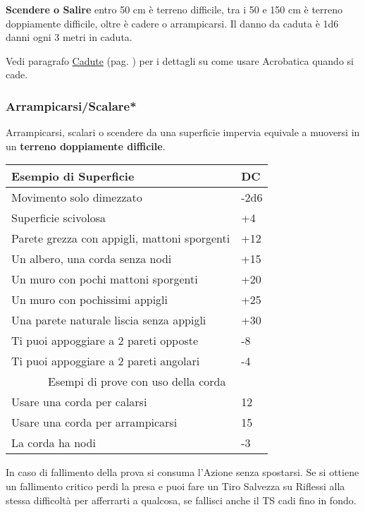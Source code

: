 \begin{multicols}{2}
\textbf{Scendere o Salire} entro 50 cm è terreno difficile, tra i 50 e 150 cm è terreno doppiamente difficile, oltre è cadere o arrampicarsi. Il danno da caduta è 1d6 danni ogni 3 metri in caduta. 

Vedi paragrafo \hyperlink{cadute}{Cadute} (pag. \pageref{cadute}) per i dettagli su come usare Acrobatica quando si cade.

\titlespacing*{\subsubsection}{0pt}{0.5em}{0.5em}\subsubsection*{Arrampicarsi/Scalare*} \label{arrampicarsi}

Arrampicarsi, scalari o scendere da una superficie impervia equivale a muoversi in un \textbf{terreno doppiamente difficile}.

\medskip

\noindent\begin{tabularx}{0.47\textwidth}{Xl}
	\textbf{Esempio di Superficie} & \textbf{DC}\\
	\toprule
	Movimento solo dimezzato & -2d6\\
	Superficie scivolosa&+4\\
	{\small Parete grezza con appigli, mattoni sporgenti}&+12\\
	Un albero, una corda senza nodi&+15\\
	Un muro con pochi mattoni sporgenti &+20\\
	Un muro con pochissimi appigli&+25\\
	Una parete naturale liscia senza appigli&+30\\
	Ti puoi appoggiare a 2 pareti opposte&-8\\
	Ti puoi appoggiare a 2 pareti angolari&-4\\
	\midrule
	\multicolumn{2}{c}{Esempi di prove con uso della corda}\\
	Usare una corda per calarsi&12\\
	Usare una corda per arrampicarsi&15\\
	La corda ha nodi & -3
\end{tabularx}

\medskip

In caso di fallimento della prova si consuma l'Azione senza spostarsi. Se si ottiene un fallimento critico perdi la presa e puoi fare un Tiro Salvezza su Riflessi alla stessa difficoltà per afferrarti a qualcosa, se fallisci anche il TS cadi fino in fondo.


\end{multicols}
